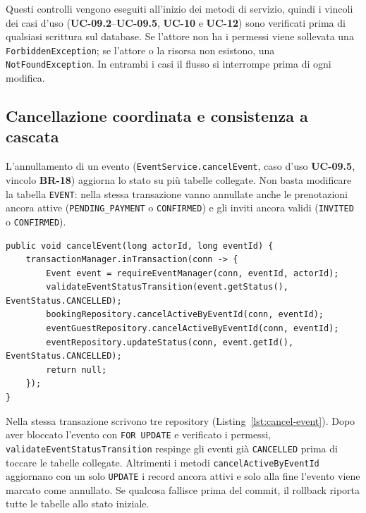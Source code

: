Questi controlli vengono eseguiti all'inizio dei metodi di servizio, quindi i vincoli dei casi d'uso (\textbf{UC-09.2}--\textbf{UC-09.5}, \textbf{UC-10} e \textbf{UC-12}) sono verificati prima di qualsiasi scrittura sul database. Se l'attore non ha i permessi viene sollevata una \texttt{ForbiddenException}; se l'attore o la risorsa non esistono, una \texttt{NotFoundException}. In entrambi i casi il flusso si interrompe prima di ogni modifica.

\subsection{Cancellazione coordinata e consistenza a cascata}
\label{sec:cancellazione-evento}

L'annullamento di un evento (\texttt{EventService.cancelEvent}, caso d'uso \textbf{UC-09.5}, vincolo \textbf{BR-18}) aggiorna lo stato su più tabelle collegate. Non basta modificare la tabella \texttt{EVENT}: nella stessa transazione vanno annullate anche le prenotazioni ancora attive (\texttt{PENDING\_PAYMENT} o \texttt{CONFIRMED}) e gli inviti ancora validi (\texttt{INVITED} o \texttt{CONFIRMED}).

\par\smallskip\noindent\begin{minipage}{\linewidth}
\begin{lstlisting}[caption={Cancellazione coordinata di un evento e propagazione dello stato.}, label={lst:cancel-event}]
public void cancelEvent(long actorId, long eventId) {
    transactionManager.inTransaction(conn -> {
        Event event = requireEventManager(conn, eventId, actorId);
        validateEventStatusTransition(event.getStatus(), EventStatus.CANCELLED);
        bookingRepository.cancelActiveByEventId(conn, eventId);
        eventGuestRepository.cancelActiveByEventId(conn, eventId);
        eventRepository.updateStatus(conn, event.getId(), EventStatus.CANCELLED);
        return null;
    });
}
\end{lstlisting}
\end{minipage}\par\medskip

Nella stessa transazione scrivono tre repository (Listing~\ref{lst:cancel-event}). Dopo aver bloccato l'evento con \texttt{FOR UPDATE} e verificato i permessi, \texttt{validateEventStatusTransition} respinge gli eventi già \texttt{CANCELLED} prima di toccare le tabelle collegate. Altrimenti i metodi \texttt{cancelActiveByEventId} aggiornano con un solo \texttt{UPDATE} i record ancora attivi e solo alla fine l'evento viene marcato come annullato. Se qualcosa fallisce prima del commit, il rollback riporta tutte le tabelle allo stato iniziale.

